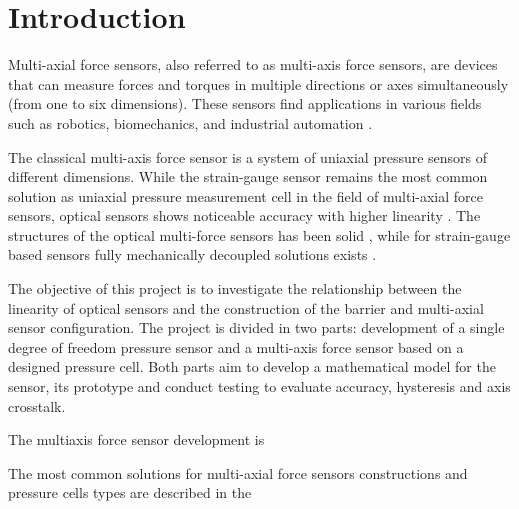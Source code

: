 \chapter{Introduction}
\label{chapter:introduction}


Multi-axial force sensors, also referred to as multi-axis force sensors, are devices that can measure forces and torques in multiple directions or axes simultaneously (from one to six dimensions). 
These sensors find applications in various fields such as robotics, biomechanics, and industrial automation \cite{multi_axis_force_sensors_review}. 


The classical multi-axis force sensor is a system of uniaxial pressure sensors of different dimensions.
While the strain-gauge sensor remains the most common solution as uniaxial pressure measurement cell in the field of multi-axial force sensors, 
optical sensors shows noticeable accuracy with higher linearity \cite{perfect_sensor}. 
The structures of the optical multi-force sensors has been solid \cite{perfect_sensor, 1990_optic}, while for strain-gauge based sensors fully mechanically decoupled solutions exists \cite{decoupling_sliding_structure, modal_sensor}. 

The objective of this project is to investigate the relationship between the linearity of optical sensors 
and the construction of the barrier and multi-axial sensor configuration.
The project is divided in two parts: development of a single degree of freedom pressure sensor and a multi-axis force sensor based on a designed pressure cell.
Both parts aim to develop a mathematical model for the sensor, its prototype and conduct testing to evaluate accuracy, hysteresis and axis crosstalk.

The multiaxis force sensor development is %


The most common solutions for multi-axial force sensors constructions and pressure cells types are described in the %




